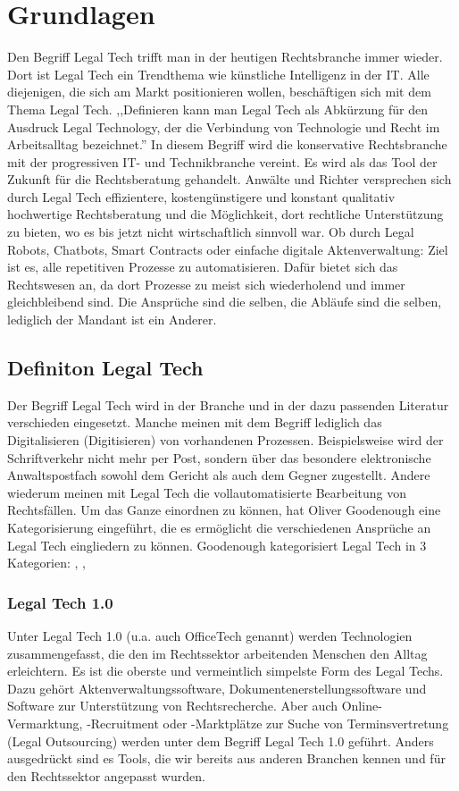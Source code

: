 \chapter{Grundlagen}
Den Begriff Legal Tech trifft man in der heutigen Rechtsbranche immer wieder. Dort ist Legal Tech
ein Trendthema wie künstliche Intelligenz in der IT. Alle diejenigen, die sich am Markt positionieren
wollen, beschäftigen sich mit dem Thema Legal Tech. ,,Definieren kann man Legal Tech als Abkürzung für
den Ausdruck Legal Technology, der die Verbindung von Technologie und Recht im Arbeitsalltag bezeichnet.''
In diesem Begriff wird die konservative Rechtsbranche mit der progressiven IT- und Technikbranche vereint.
Es wird als das Tool der Zukunft für die Rechtsberatung gehandelt. Anwälte und Richter versprechen sich durch
Legal Tech effizientere, kostengünstigere und konstant qualitativ hochwertige Rechtsberatung und die Möglichkeit, dort rechtliche Unterstützung zu bieten, 
wo es bis jetzt nicht wirtschaftlich sinnvoll war.
Ob durch Legal Robots, Chatbots, Smart Contracts oder einfache digitale Aktenverwaltung: Ziel ist es, alle repetitiven Prozesse
zu automatisieren. Dafür bietet sich das Rechtswesen an, da dort Prozesse zu meist sich wiederholend und immer gleichbleibend sind.
Die Ansprüche sind die selben, die Abläufe sind die selben, lediglich der Mandant ist ein Anderer.

\section{Definiton Legal Tech}
Der Begriff Legal Tech wird in der Branche und in der dazu passenden Literatur verschieden eingesetzt.
Manche meinen mit dem Begriff lediglich das Digitalisieren (Digitisieren) von vorhandenen Prozessen.
Beispielsweise wird der Schriftverkehr nicht mehr per Post, sondern über das besondere elektronische Anwaltspostfach sowohl dem Gericht als auch dem
Gegner zugestellt. Andere wiederum meinen mit Legal Tech die vollautomatisierte Bearbeitung von Rechtsfällen. Um das Ganze
einordnen zu können, hat Oliver Goodenough eine Kategorisierung eingeführt, die es ermöglicht die verschiedenen Ansprüche
an Legal Tech eingliedern zu können. Goodenough kategorisiert Legal Tech in 3 Kategorien: , ,  

\subsection{Legal Tech 1.0} \label{Legal Tech 1.0}
Unter Legal Tech 1.0 (u.a. auch OfficeTech genannt) werden Technologien zusammengefasst, die den im Rechtssektor arbeitenden Menschen den Alltag erleichtern. Es ist die oberste und vermeintlich simpelste Form des Legal Techs. Dazu gehört Aktenverwaltungssoftware, Dokumentenerstellungssoftware und Software zur Unterstützung von Rechtsrecherche. Aber auch Online-Vermarktung, -Recruitment oder -Marktplätze zur Suche von Terminsvertretung (Legal Outsourcing) werden unter dem Begriff Legal Tech 1.0 geführt. Anders ausgedrückt sind es Tools, die wir bereits aus anderen Branchen kennen und für den Rechtssektor angepasst wurden. 
